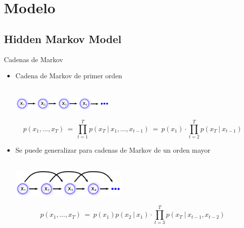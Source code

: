 
\section{Modelo}
\subsection{Hidden Markov Model}
\begin{frame}{Cadenas de Markov}
    \begin{itemize}
      \itemsep2em
      \item Cadena de Markov de primer orden      
        \\~\\
        \begin{center}
          \includegraphics[width=0.4\textwidth]{gfx/mod-mm1}
        \end{center}        
        \begin{equation}
          \label{eqn:2-4}
          p(x_1, ..., x_T) 
            ~=~ \prod_{t=1}^T p(x_T ~|~ x_1, ..., x_{t-1}) 
            ~=~ p(x_1) \cdot \prod_{t=2}^T p(x_T ~|~ x_{t-1}) 
        \end{equation} 
      \item  Se puede generalizar para cadenas de Markov de un orden mayor
        \\~\\
        \begin{center}
          \includegraphics[width=0.45\textwidth]{gfx/mod-mm2}
        \end{center}
        \begin{equation}
          \label{eqn:2-4}
          p(x_1, ..., x_T) 
            ~=~ p(x_1) p(x_2 ~|~ x_1) \cdot \prod_{t=3}^T p(x_T ~|~ x_{t-1}, x_{t-2}) 
        \end{equation} 
  \end{itemize} 
\end{frame}


